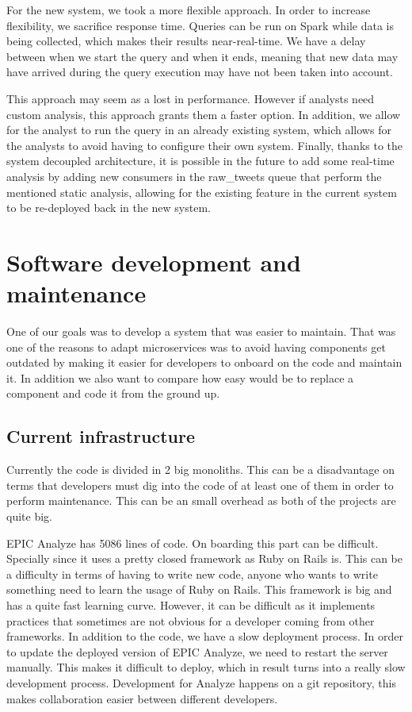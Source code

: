 For the new system, we took a more flexible approach. In order to increase flexibility, we sacrifice response time. Queries can be run on Spark while data is being collected, which makes their results near-real-time. We have a delay between when we start the query and when it ends, meaning that new data may have arrived during the query execution may have not been taken into account. 

This approach may seem as a lost in performance. However if analysts need custom analysis, this approach grants them a faster option. In addition, we allow for the analyst to run the query in an already existing system, which allows for the analysts to avoid having to configure their own system. Finally, thanks to the system decoupled architecture, it is possible in the future to add some real-time analysis by adding new consumers in the raw\_tweets queue that perform the mentioned static analysis, allowing for the existing feature in the current system to be re-deployed back in the new system.

\section{Software development and maintenance}

One of our goals was to develop a system that was easier to maintain. That was one of the reasons to adapt microservices was to avoid having components get outdated by making it easier for developers to onboard on the code and maintain it. In addition we also want to compare how easy would be to replace a component and code it from the ground up.

\subsection{Current infrastructure}

Currently the code is divided in 2 big monoliths. This can be a disadvantage on terms that developers must dig into the code of at least one of them in order to perform maintenance. This can be an small overhead as both of the projects are quite big. 

EPIC Analyze has 5086 lines of code. On boarding this part can be difficult. Specially since it uses a pretty closed framework as Ruby on Rails is. This can be a difficulty in terms of having to write new code, anyone who wants to write something need to learn the usage of Ruby on Rails. This framework is big and has a quite fast learning curve. However, it can be difficult as it implements practices that sometimes are not obvious for a developer coming from other frameworks. In addition to the code, we have a slow deployment process. In order to update the deployed version of EPIC Analyze, we need to restart the server manually. This makes it difficult to deploy, which in result turns into a really slow development process. Development for Analyze happens on a git repository, this makes collaboration easier between different developers.

